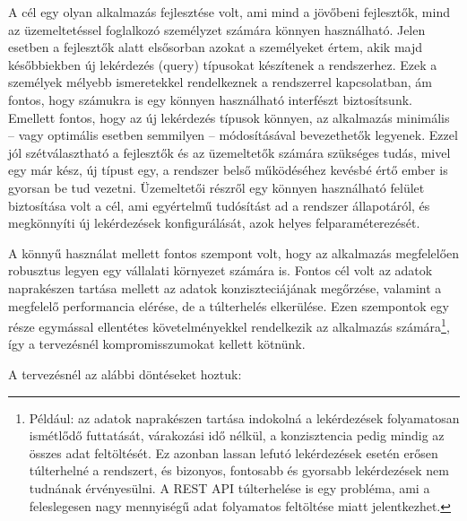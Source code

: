 A cél egy olyan alkalmazás fejlesztése volt, ami mind a jövőbeni fejlesztők, mind az üzemeltetéssel foglalkozó személyzet számára könnyen használható. Jelen esetben a fejlesztők alatt elsősorban azokat a személyeket értem, akik majd későbbiekben új lekérdezés (query) típusokat készítenek a rendszerhez. Ezek a személyek mélyebb ismeretekkel rendelkeznek a rendszerrel kapcsolatban, ám fontos, hogy számukra is egy könnyen használható interfészt biztosítsunk. Emellett fontos, hogy az új lekérdezés típusok könnyen, az alkalmazás minimális -- vagy optimális esetben semmilyen -- módosításával bevezethetők legyenek. Ezzel jól szétválasztható a fejlesztők és az üzemeltetők számára szükséges tudás, mivel egy már kész, új típust egy, a rendszer belső működéséhez kevésbé értő ember is gyorsan be tud vezetni. Üzemeltetői részről egy könnyen használható felület biztosítása volt a cél, ami egyértelmű tudósítást ad a rendszer állapotáról, és megkönnyíti új lekérdezések konfigurálását, azok helyes felparaméterezését.

A könnyű használat mellett fontos szempont volt, hogy az alkalmazás megfelelően robusztus legyen egy vállalati környezet számára is. Fontos cél volt az adatok naprakészen tartása mellett az adatok konziszteciájának megőrzése, valamint a megfelelő performancia elérése, de a túlterhelés elkerülése. Ezen szempontok egy része egymással ellentétes követelményekkel rendelkezik az alkalmazás számára\footnote{Például: az adatok naprakészen tartása indokolná a lekérdezések folyamatosan ismétlődő futtatását, várakozási idő nélkül, a konzisztencia pedig mindig az összes adat feltöltését. Ez azonban lassan lefutó lekérdezések esetén erősen túlterhelné a rendszert, és bizonyos, fontosabb és gyorsabb lekérdezések nem tudnának érvényesülni. A REST API túlterhelése is egy probléma, ami a feleslegesen nagy mennyiségű adat folyamatos feltöltése miatt jelentkezhet.}, így a tervezésnél kompromisszumokat kellett kötnünk.

A tervezésnél az alábbi döntéseket hoztuk:

